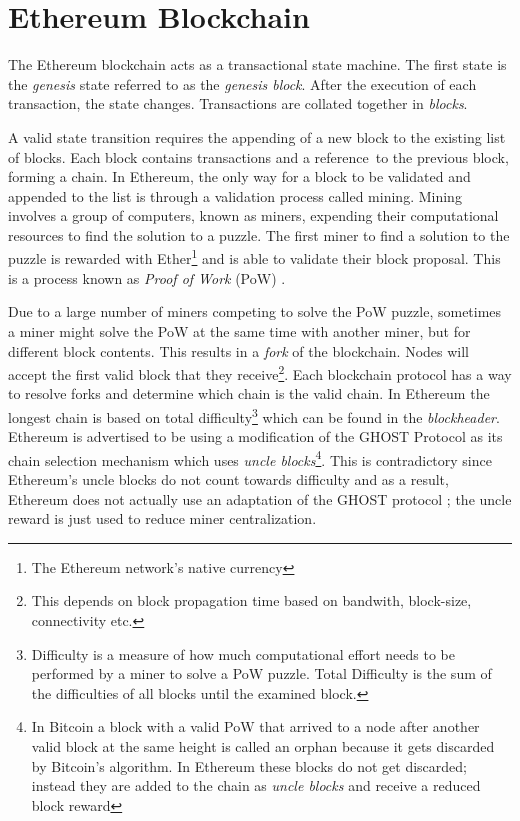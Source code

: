 \section{Ethereum Blockchain}
The Ethereum blockchain acts as a transactional state machine. The first state is the \textit{genesis} state referred to as the \textit{genesis block}. After the execution of each transaction, the state changes. Transactions are collated together in \textit{blocks}. 



A valid state transition requires the appending of a new block to the existing list of blocks. Each block contains transactions and a reference~to the previous block, forming a chain. In Ethereum, the only way for a block to be validated and appended to the list is through a validation process called mining. Mining involves a group of computers, known as miners, expending their computational resources to find the solution to a puzzle. The first miner to find a solution to the puzzle is rewarded with Ether\footnote{The Ethereum network's native currency} and is able to validate their block proposal. This is a process known as \textit{Proof of Work} (PoW) \cite{pow}. 

Due to a large number of miners competing to solve the PoW puzzle, sometimes a miner might solve the PoW at the same time with another miner, but for different block contents. This results in a \textit{fork} of the blockchain. Nodes will accept the first valid block that they receive\footnote{This depends on block propagation time based on bandwith, block-size, connectivity etc.}. Each blockchain protocol has a way to resolve forks and determine which chain is the valid chain. In Ethereum the longest chain is based on total difficulty\footnote{Difficulty is a measure of how much computational effort needs to be performed by a miner to solve a PoW puzzle. Total Difficulty is the sum of the difficulties of all blocks until the examined block.} which can be found in the \textit{blockheader}. Ethereum is advertised to be using a modification of the GHOST Protocol \cite{GHOST} as its chain selection mechanism which uses \textit{uncle blocks}\footnote{In Bitcoin a block with a valid PoW that arrived to a node after another valid block at the same height is called an orphan because it gets discarded by Bitcoin's algorithm. In Ethereum these blocks do not get discarded; instead they are added to the chain as \textit{uncle blocks} and receive a reduced block reward}. This is contradictory since Ethereum's uncle blocks do not count towards difficulty and as a result, Ethereum does not actually use an adaptation of the GHOST protocol \cite{Gervais:2016:SPP:2976749.2978341}; the uncle reward is just used to reduce miner centralization.

